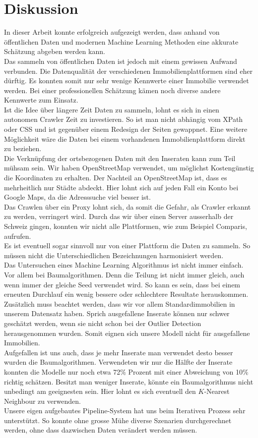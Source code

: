 \section{Diskussion}
In dieser Arbeit konnte erfolgreich aufgezeigt werden, dass anhand von öffentlichen Daten und modernen Machine Learning Methoden eine akkurate Schätzung abgeben werden kann.\\[2ex]
%
Das sammeln von öffentlichen Daten ist jedoch mit einem gewissen Aufwand verbunden. Die Datenqualität der verschiedenen Immobilienplattformen sind eher dürftig. Es konnten somit nur sehr wenige Kennwerte einer Immobilie verwendet werden. Bei einer professionellen Schätzung kämen noch diverse andere Kennwerte zum Einsatz.\\
Ist die Idee über längere Zeit Daten zu sammeln, lohnt es sich in einen autonomen Crawler Zeit zu investieren. So ist man nicht abhängig vom XPath oder CSS und ist gegenüber einem Redesign der Seiten gewappnet. Eine weitere Möglichkeit wäre die Daten bei einem vorhandenen Immobilienplattform direkt zu beziehen.\\
Die Verknüpfung der ortsbezogenen Daten mit den Inseraten kann zum Teil mühsam sein. Wir haben OpenStreetMap verwendet, um möglichst Kostengünstig die Koordinaten zu erhalten. Der Nachteil an OpenStreetMap ist, dass es mehrheitlich nur Städte abdeckt. Hier lohnt sich auf jeden Fall ein Konto bei Google Maps, da die Adresssuche viel besser ist.\\[2ex]
%
Das Crawlen über ein Proxy lohnt sich, da somit die Gefahr, als Crawler erkannt zu werden, verringert wird. Durch das wir über einen Server ausserhalb der Schweiz gingen, konnten wir nicht alle Plattformen, wie zum Beispiel Comparis, aufrufen.\\
Es ist eventuell sogar sinnvoll nur von einer Plattform die Daten zu sammeln. So müssen nicht die Unterschiedlichen Bezeichnungen harmonisiert werden.\\[2ex]
%
Das Untersuchen eines Machine Learning Algorithmus ist nicht immer einfach. Vor allem bei Baumalgorithmen. Denn die Teilung ist nicht immer gleich, auch wenn immer der gleiche Seed verwendet wird. So kann es sein, dass bei einem erneuten Durchlauf ein wenig bessere oder schlechtere Resultate herauskommen.\\
Zusätzlich muss beachtet werden, dass wir vor allem Standardimmobilien in unserem Datensatz haben. Sprich ausgefallene Inserate können nur schwer geschätzt werden, wenn sie nicht schon bei der Outlier Detection herausgenommen wurden. Somit eignen sich unsere Modell nicht für ausgefallene Immobilien.\\[2ex]
%
Aufgefallen ist uns auch, dass je mehr Inserate man verwendet desto besser wurden die Baumalgorithmen. Verwendeten wir nur die Hälfte der Inserate konnten die Modelle nur noch etwa 72\% Prozent mit einer Abweichung von 10\% richtig schätzen. Besitzt man weniger Inserate, könnte ein Baumalgorithmus nicht unbedingt am geeignesten sein. Hier lohnt es sich eventuell den $K$-Nearest Neighbour zu verwenden.
\\[2ex]
%
Unsere eigen aufgebautes Pipeline-System hat uns beim Iterativen Prozess sehr unterstützt. So konnte ohne grosse Mühe diverse Szenarien durchgerechnet werden, ohne dass dazwischen Daten verändert werden müssen.
%
